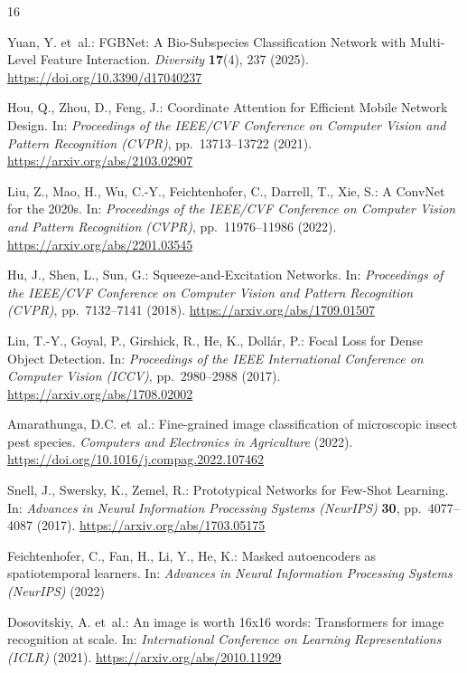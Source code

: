 \documentclass[runningheads]{llncs}
\begin{document}
\begin{thebibliography}{16}

Yuan, Y. et~al.: FGBNet: A Bio-Subspecies Classification Network with Multi-Level Feature Interaction. \emph{Diversity} \textbf{17}(4), 237 (2025). \url{https://doi.org/10.3390/d17040237}

Hou, Q., Zhou, D., Feng, J.: Coordinate Attention for Efficient Mobile Network Design. In: \emph{Proceedings of the IEEE/CVF Conference on Computer Vision and Pattern Recognition (CVPR)}, pp.~13713--13722 (2021). \url{https://arxiv.org/abs/2103.02907}

Liu, Z., Mao, H., Wu, C.-Y., Feichtenhofer, C., Darrell, T., Xie, S.: A ConvNet for the 2020s. In: \emph{Proceedings of the IEEE/CVF Conference on Computer Vision and Pattern Recognition (CVPR)}, pp.~11976--11986 (2022). \url{https://arxiv.org/abs/2201.03545}

Hu, J., Shen, L., Sun, G.: Squeeze-and-Excitation Networks. In: \emph{Proceedings of the IEEE/CVF Conference on Computer Vision and Pattern Recognition (CVPR)}, pp.~7132--7141 (2018). \url{https://arxiv.org/abs/1709.01507}

Lin, T.-Y., Goyal, P., Girshick, R., He, K., Doll\'{a}r, P.: Focal Loss for Dense Object Detection. In: \emph{Proceedings of the IEEE International Conference on Computer Vision (ICCV)}, pp.~2980--2988 (2017). \url{https://arxiv.org/abs/1708.02002}

Amarathunga, D.C. et~al.: Fine-grained image classification of microscopic insect pest species. \emph{Computers and Electronics in Agriculture} (2022). \url{https://doi.org/10.1016/j.compag.2022.107462}

Snell, J., Swersky, K., Zemel, R.: Prototypical Networks for Few-Shot Learning. In: \emph{Advances in Neural Information Processing Systems (NeurIPS)} \textbf{30}, pp.~4077--4087 (2017). \url{https://arxiv.org/abs/1703.05175}

Feichtenhofer, C., Fan, H., Li, Y., He, K.: Masked autoencoders as spatiotemporal learners. In: \emph{Advances in Neural Information Processing Systems (NeurIPS)} (2022)

Dosovitskiy, A. et~al.: An image is worth 16x16 words: Transformers for image recognition at scale. In: \emph{International Conference on Learning Representations (ICLR)} (2021). \url{https://arxiv.org/abs/2010.11929}


\end{thebibliography}
\end{document}
